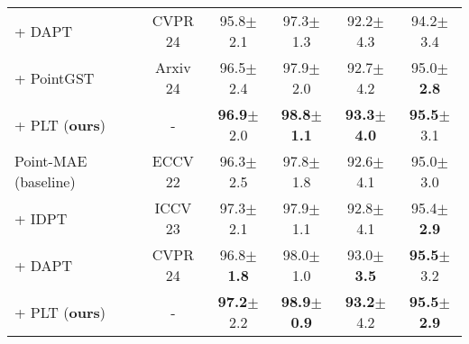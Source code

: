 \begin{table}[!t]
\begin{tabular}{lccccc}
   + DAPT~\cite{zhou2024dynamic} & CVPR 24&95.8$\pm$2.1 &97.3$\pm$1.3 &92.2$\pm$4.3 &94.2$\pm$3.4 \\
   + PointGST~\cite{liang2024parameter}  & Arxiv 24&96.5$\pm$2.4 &97.9$\pm$2.0 &92.7$\pm$4.2 &95.0$\pm$\textbf{2.8} \\
   \rowcolor{linecolor!40}+ PLT (\textbf{ours}) & -&\textbf{96.9}$\pm$2.0 &\textbf{98.8}$\pm$\textbf{1.1}&\textbf{93.3}$\pm$\textbf{4.0} &\textbf{95.5}$\pm$3.1 \\
    \midrule
    Point-MAE~\cite{pang2022masked} (baseline) &ECCV 22   & 96.3$\pm$2.5 & 97.8$\pm$1.8 & 92.6$\pm$4.1 & 95.0$\pm$3.0\\
   + IDPT~\cite{zha2023instance} &   ICCV 23    & 97.3$\pm$2.1& 97.9$\pm$1.1& 92.8$\pm$4.1& 95.4$\pm$\textbf{2.9}\\
   + DAPT~\cite{zhou2024dynamic} & CVPR 24 & 96.8$\pm$\textbf{1.8}  &  98.0$\pm$1.0 & 93.0$\pm$\textbf{3.5} & \textbf{95.5}$\pm$3.2  \\
   \rowcolor{linecolor!40}+ PLT (\textbf{ours}) & - & \textbf{97.2}$\pm$2.2  &  \textbf{98.9}$\pm$\textbf{0.9} & \textbf{93.2}$\pm$4.2 & \textbf{95.5}$\pm$\textbf{2.9}  \\
    \bottomrule
    \end{tabular}%
  \label{tab:fewshot}%
\end{table}%